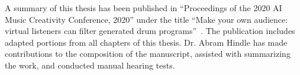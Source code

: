 \documentclass[\main/thesis.tex]{subfiles}
\begin{document}
\begin{preface}
A summary of this thesis has been published in \enquote{Proceedings of the 2020 AI Music Creativity Conference, 2020} under the title \enquote{Make your own audience: virtual listeners can filter generated drum programs}~\cite{salimiCSMC2020-virtual-listeners-drums}. The publication includes adapted portions from all chapters of this thesis.  Dr. Abram Hindle has made contributions to the composition of the manuscript, assisted with summarizing the work, and conducted manual hearing tests.


\end{preface}
\end{document}
